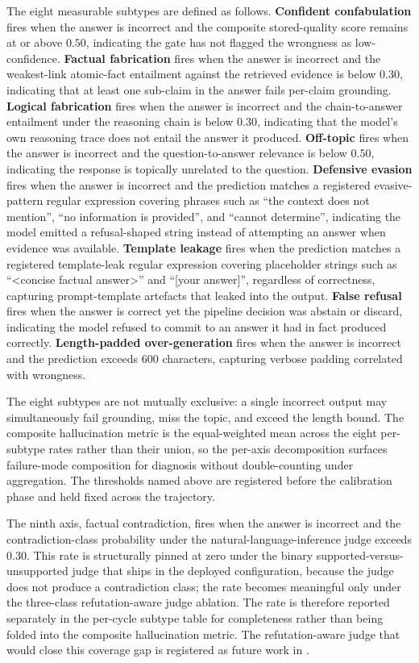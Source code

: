 The eight measurable subtypes are defined as follows. \textbf{Confident confabulation} fires when the answer is incorrect and the composite stored-quality score remains at or above $0.50$, indicating the gate has not flagged the wrongness as low-confidence. \textbf{Factual fabrication} fires when the answer is incorrect and the weakest-link atomic-fact entailment against the retrieved evidence is below $0.30$, indicating that at least one sub-claim in the answer fails per-claim grounding. \textbf{Logical fabrication} fires when the answer is incorrect and the chain-to-answer entailment under the reasoning chain is below $0.30$, indicating that the model's own reasoning trace does not entail the answer it produced. \textbf{Off-topic} fires when the answer is incorrect and the question-to-answer relevance is below $0.50$, indicating the response is topically unrelated to the question. \textbf{Defensive evasion} fires when the answer is incorrect and the prediction matches a registered evasive-pattern regular expression covering phrases such as ``the context does not mention'', ``no information is provided'', and ``cannot determine'', indicating the model emitted a refusal-shaped string instead of attempting an answer when evidence was available. \textbf{Template leakage} fires when the prediction matches a registered template-leak regular expression covering placeholder strings such as ``\textless concise factual answer\textgreater'' and ``[your answer]'', regardless of correctness, capturing prompt-template artefacts that leaked into the output. \textbf{False refusal} fires when the answer is correct yet the pipeline decision was abstain or discard, indicating the model refused to commit to an answer it had in fact produced correctly. \textbf{Length-padded over-generation} fires when the answer is incorrect and the prediction exceeds $600$ characters, capturing verbose padding correlated with wrongness.

The eight subtypes are not mutually exclusive: a single incorrect output may simultaneously fail grounding, miss the topic, and exceed the length bound. The composite hallucination metric is the equal-weighted mean across the eight per-subtype rates rather than their union, so the per-axis decomposition surfaces failure-mode composition for diagnosis without double-counting under aggregation. The thresholds named above are registered before the calibration phase and held fixed across the trajectory.

The ninth axis, factual contradiction, fires when the answer is incorrect and the contradiction-class probability under the natural-language-inference judge exceeds $0.30$. This rate is structurally pinned at zero under the binary supported-versus-unsupported judge that ships in the deployed configuration, because the judge does not produce a contradiction class; the rate becomes meaningful only under the three-class refutation-aware judge ablation. The rate is therefore reported separately in the per-cycle subtype table for completeness rather than being folded into the composite hallucination metric. The refutation-aware judge that would close this coverage gap is registered as future work in .

